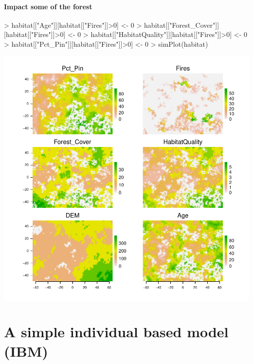 \documentclass{article}
\begin{document}
\paragraph{Impact some of the forest}
\begin{Schunk}
\begin{Sinput}
>   habitat[["Age"]][habitat[["Fires"]]>0] <- 0
> habitat[["Forest_Cover"]][habitat[["Fires"]]>0] <- 0
> habitat[["HabitatQuality"]][habitat[["Fires"]]>0] <- 0
> habitat[["Pct_Pin"]][habitat[["Fires"]]>0] <- 0
> simPlot(habitat)
\end{Sinput}
\end{Schunk}
\includegraphics{introduction-Fire-impacts-maps}

\section{A simple individual based model (IBM)}

\lipsum
\end{document}
